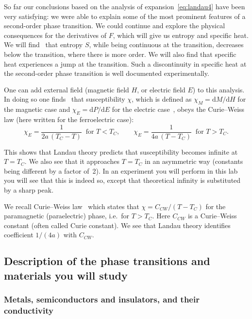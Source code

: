 \documentclass[11pt,a4paper]{article}
\begin{document}
So far our conclusions based on the analysis of expansion~\eqref{eq:landau4} have
been very satisfying: we were able to explain some of the most prominent features
of a second-order phase transition. We could continue and explore the physical
consequences for the derivatives of $F$, which will give us entropy and specific
heat. We will find~\cite{ref:gittrman,ref:papon} that entropy $S$, while being
continuous at the transition, decreases below the transition, where there is more
order. We will also find that specific heat experiences a jump at the transition.
Such a discontinuity in specific heat at the second-order phase transition is well
documented experimentally.

One can add external field (magnetic field $H$, or electric field $E$) to this
analysis. In doing so one
finds~\cite{ref:gittrman,ref:papon} that susceptibility $\chi$, which is defined
as $\chi_M = \mathrm{d}M/\mathrm{d}H$ for the magnetic case and
$\chi_E = \mathrm{d}P/\mathrm{d}E$ for the electric
case~\cite{ref:gittrman,ref:papon,ref:ashcroft}, obeys the Curie--Weiss law (here
written for the ferroelectric case):
\begin{equation}\label{eq:landauchi}
  \chi_E = \frac{1}{2a\,(T_C - T)} \ \text{ for } T < T_C,
  \qquad
  \chi_E = \frac{1}{4a\,(T - T_C)} \ \text{ for } T > T_C.
\end{equation}

This shows that Landau theory predicts that susceptibility becomes infinite at
$T = T_C$. We also see that it approaches $T = T_C$ in an asymmetric way
(constants being different by a factor of~2). In an experiment you will perform in
this lab you will see that this is indeed so, except that theoretical infinity is
substituted by a sharp peak.

We recall Curie--Weiss law~\cite{ref:gittrman,ref:papon,ref:ashcroft} which states
that $\chi = C_{CW}/(T - T_C)$ for the paramagnetic (paraelectric) phase, i.e.\
for $T > T_C$. Here $C_{CW}$ is a Curie--Weiss constant (often called Curie
constant). We see that Landau theory identifies coefficient $1/(4a)$ with
$C_{CW}$.

\subsection{Description of the phase transitions and materials you will
            study}\label{sec:materials}

\subsubsection{Metals, semiconductors and insulators, and their conductivity}
\end{document}

